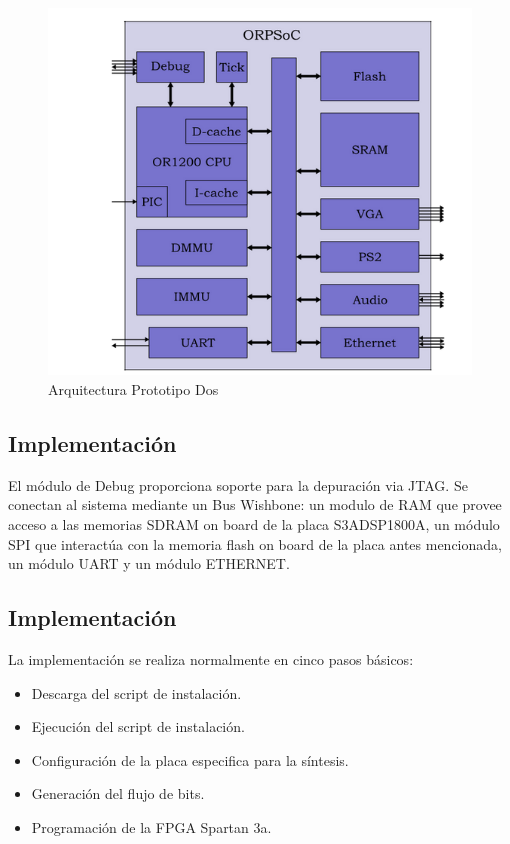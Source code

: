 		\begin{figure}[!h]
 		\begin{center}
  		\includegraphics[width=.7\textwidth,keepaspectratio=true]{./images/orpsoc}
  		\caption{Arquitectura Prototipo Dos}
  		\label{fig:orpsoc} 
 		\end{center}
		\end{figure}



	
		\subsection{Implementación}


		El módulo de Debug proporciona soporte para la depuración via JTAG. Se conectan al sistema mediante un Bus Wishbone: un modulo de RAM que provee
		acceso a las memorias SDRAM on board de la placa S3ADSP1800A, un módulo SPI que interactúa con la memoria flash on board
		de la placa antes mencionada, un módulo UART y un módulo ETHERNET. 

		\subsection{Implementación}
		La implementación se realiza normalmente en cinco pasos básicos: 
		\begin {itemize}
		\item Descarga del script de instalación.
		\item Ejecución del script de instalación.
		\item Configuración de la placa especifica para la síntesis.
		\item Generación del flujo de bits.
		\item Programación de la FPGA Spartan 3a.
 		\end {itemize}
 

